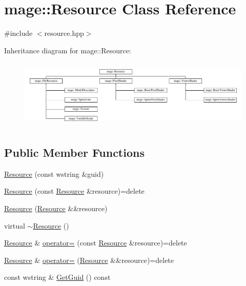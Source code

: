 \hypertarget{classmage_1_1_resource}{}\section{mage\+:\+:Resource Class Reference}
\label{classmage_1_1_resource}


{\ttfamily \#include $<$resource.\+hpp$>$}

Inheritance diagram for mage\+:\+:Resource\+:\begin{figure}[H]
\begin{center}
\leavevmode
\includegraphics[height=3.353293cm]{classmage_1_1_resource}
\end{center}
\end{figure}
\subsection*{Public Member Functions}
\begin{DoxyCompactItemize}
\item 
\hyperlink{classmage_1_1_resource_a3e2540455d88e1825a680fb4e7fe25c4}{Resource} (const wstring \&guid)
\item 
\hyperlink{classmage_1_1_resource_a4ee2dba2675546b603e03a69a2f2db52}{Resource} (const \hyperlink{classmage_1_1_resource}{Resource} \&resource)=delete
\item 
\hyperlink{classmage_1_1_resource_a3f96177d661b3c3b6e7ac9fa6eba4130}{Resource} (\hyperlink{classmage_1_1_resource}{Resource} \&\&resource)
\item 
virtual \hyperlink{classmage_1_1_resource_a9721681581176960987a9aef6bac26aa}{$\sim$\+Resource} ()
\item 
\hyperlink{classmage_1_1_resource}{Resource} \& \hyperlink{classmage_1_1_resource_ad8fa57f37eb253b90d18d33383b12875}{operator=} (const \hyperlink{classmage_1_1_resource}{Resource} \&resource)=delete
\item 
\hyperlink{classmage_1_1_resource}{Resource} \& \hyperlink{classmage_1_1_resource_a5d087980bb8fb1cd7d96c22d9e0eb519}{operator=} (\hyperlink{classmage_1_1_resource}{Resource} \&\&resource)=delete
\item 
const wstring \& \hyperlink{classmage_1_1_resource_a4e05079ab19ef95e11cefa487690fd25}{Get\+Guid} () const
\end{DoxyCompactItemize}
